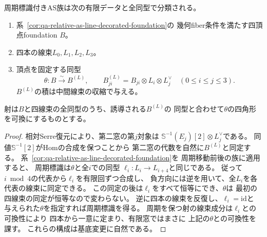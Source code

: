 \begin{corollary}[周期標識付きASの有限データ]
\label{cor:qa-periodic-as-finite-decoration}
周期標識付きAS族は次の有限データと全同型で分類される。
\begin{enumerate}
\item 系~\ref{cor:qa-relative-as-line-decorated-foundation}の
幾何fiber条件を満たす四頂点foundation $B$。
\item 四本の線束$L_0,L_1,L_2,L_3$。
\item 頂点を固定する同型
\[
 \theta:B\xrightarrow{\sim}B^{(L)},\qquad
 B^{(L)}_{ji}= B_{ji}\otimes L_i\otimes L_j^\vee
 \quad(0\le i\le j\le3).
\]
$B^{(L)}$の積は中間線束の収縮で与える。
\end{enumerate}
射は$B$と四線束の全同型のうち、誘導される$B^{(L)}$の
同型と合わせて$\theta$の四角形を可換にするものとする。
\end{corollary}
\begin{proof}
相対Serre復元により、第二窓の第$j$対象は
$\mathbb S^{-1}(E_j)[2]\otimes L_j^\vee$である。
同値$\mathbb S^{-1}[2]$がHomの合成を保つことから
第二窓の代数を自然に$B^{(L)}$と同定する。
系~\ref{cor:qa-relative-as-line-decorated-foundation}を
周期移動前後の族に適用すると、
周期標識は$\theta$と全$i$での同型
$\ell_i:L_i\to L_{i+4}$と同じである。
従って$i\bmod4$の代表から$\ell_i$を有限回ずつ合成し、
負方向には逆を用いて、全$L_i$を各代表の線束に同定できる。
この同定の後は$\ell_i$をすべて恒等にでき、$\theta$は
最初の四線束の同定が恒等なので変わらない。
逆に四本の線束を反復し、$\ell_i=\mathrm{id}$と
与えられた$\theta$を指定すれば周期標識を得る。
周期を保つ射の線束成分は$\ell_i$との可換性により
四本から一意に定まり、有限窓ではまさに
上記の$\theta$との可換性を課す。
これらの構成は基底変更に自然である。
\end{proof}

